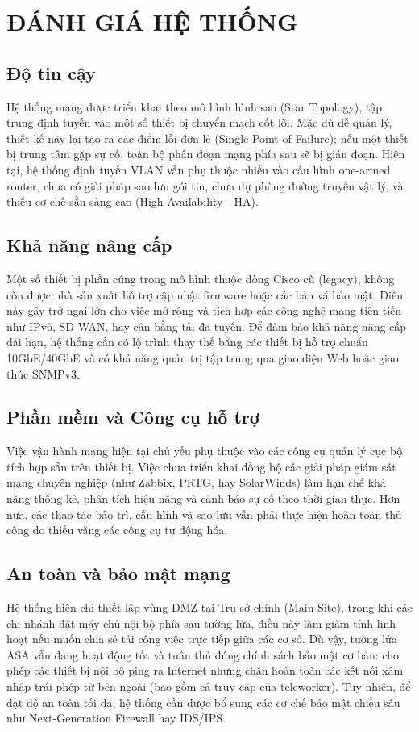 \section{ĐÁNH GIÁ HỆ THỐNG}

\subsection{Độ tin cậy}
Hệ thống mạng được triển khai theo mô hình hình sao (Star Topology), tập trung định tuyến vào một số thiết bị chuyển mạch cốt lõi. Mặc dù dễ quản lý, thiết kế này lại tạo ra các điểm lỗi đơn lẻ (Single Point of Failure); nếu một thiết bị trung tâm gặp sự cố, toàn bộ phân đoạn mạng phía sau sẽ bị gián đoạn. Hiện tại, hệ thống định tuyến VLAN vẫn phụ thuộc nhiều vào cấu hình one-armed router, chưa có giải pháp sao lưu gói tin, chưa dự phòng đường truyền vật lý, và thiếu cơ chế sẵn sàng cao (High Availability - HA).

\subsection{Khả năng nâng cấp}
Một số thiết bị phần cứng trong mô hình thuộc dòng Cisco cũ (legacy), không còn được nhà sản xuất hỗ trợ cập nhật firmware hoặc các bản vá bảo mật. Điều này gây trở ngại lớn cho việc mở rộng và tích hợp các công nghệ mạng tiên tiến như IPv6, SD-WAN, hay cân bằng tải đa tuyến. Để đảm bảo khả năng nâng cấp dài hạn, hệ thống cần có lộ trình thay thế bằng các thiết bị hỗ trợ chuẩn 10GbE/40GbE và có khả năng quản trị tập trung qua giao diện Web hoặc giao thức SNMPv3.

\subsection{Phần mềm và Công cụ hỗ trợ}
Việc vận hành mạng hiện tại chủ yếu phụ thuộc vào các công cụ quản lý cục bộ tích hợp sẵn trên thiết bị. Việc chưa triển khai đồng bộ các giải pháp giám sát mạng chuyên nghiệp (như Zabbix, PRTG, hay SolarWinds) làm hạn chế khả năng thống kê, phân tích hiệu năng và cảnh báo sự cố theo thời gian thực. Hơn nữa, các thao tác bảo trì, cấu hình và sao lưu vẫn phải thực hiện hoàn toàn thủ công do thiếu vắng các công cụ tự động hóa.

\subsection{An toàn và bảo mật mạng}
Hệ thống hiện chỉ thiết lập vùng DMZ tại Trụ sở chính (Main Site), trong khi các chi nhánh đặt máy chủ nội bộ phía sau tường lửa, điều này làm giảm tính linh hoạt nếu muốn chia sẻ tải công việc trực tiếp giữa các cơ sở. Dù vậy, tường lửa ASA vẫn đang hoạt động tốt và tuân thủ đúng chính sách bảo mật cơ bản: cho phép các thiết bị nội bộ ping ra Internet nhưng chặn hoàn toàn các kết nối xâm nhập trái phép từ bên ngoài (bao gồm cả truy cập của teleworker). Tuy nhiên, để đạt độ an toàn tối đa, hệ thống cần được bổ sung các cơ chế bảo mật chiều sâu như Next-Generation Firewall hay IDS/IPS.

